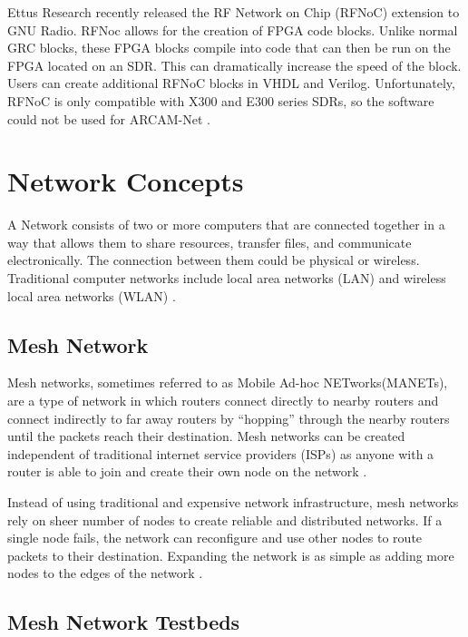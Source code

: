 Ettus Research recently released the RF Network on Chip (RFNoC) extension to GNU Radio. RFNoc allows for the creation of FPGA code blocks. Unlike normal GRC blocks, these FPGA blocks compile into code that can then be run on the FPGA located on an SDR. This can dramatically increase the speed of the block. Users can create additional RFNoC blocks in VHDL and Verilog. Unfortunately, RFNoC is only compatible with X300 and E300 series SDRs, so the software could not be used for ARCAM-Net \cite{0028}. 


\section{Network Concepts}

A Network consists of two or more computers that are connected together in a way that allows them to share resources, transfer files, and communicate electronically. The connection between them could be physical or wireless. Traditional computer networks include local area networks (LAN) and wireless local area networks (WLAN) \cite{529072} \cite{0029}. 

\subsection{Mesh Network}

Mesh networks, sometimes referred to as Mobile Ad-hoc NETworks(MANETs), are a type of network in which routers connect directly to nearby routers and connect indirectly to far away routers by ``hopping'' through the nearby routers until the packets reach their destination. Mesh networks can be created independent of traditional internet service providers (ISPs) as anyone with a router is able to join and create their own node on the network \cite{6908725}. 

Instead of using traditional and expensive network infrastructure, mesh networks rely on sheer number of nodes to create reliable and distributed networks. If a single node fails, the network can reconfigure and use other nodes to route packets to their destination. Expanding the network is as simple as adding more nodes to the edges of the network \cite{6908725}. 

\subsection{Mesh Network Testbeds}

